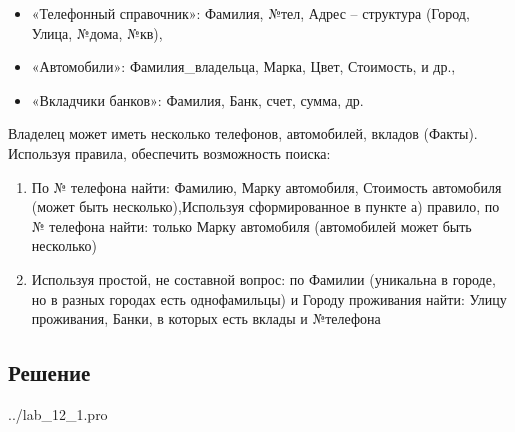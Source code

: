 \begin{itemize}
	\item «Телефонный справочник»: Фамилия, №тел, Адрес – структура (Город,
	Улица, №дома, №кв),
	\item «Автомобили»: Фамилия\_владельца, Марка, Цвет, Стоимость, и др.,
	\item «Вкладчики банков»: Фамилия, Банк, счет, сумма, др.
\end{itemize}
Владелец может иметь несколько телефонов, автомобилей, вкладов (Факты).
Используя правила, обеспечить возможность поиска:
\begin{enumerate}
	\item По № телефона найти: Фамилию, Марку автомобиля, Стоимость автомобиля
	(может быть несколько),Используя сформированное в пункте а) правило, по № телефона найти:
	только Марку автомобиля (автомобилей может быть несколько)
	\item Используя простой, не составной вопрос: по Фамилии (уникальна в городе, но в
	разных городах есть однофамильцы) и Городу проживания найти:
	Улицу
	проживания, Банки, в которых есть вклады и №телефона
\end{enumerate}

\subsection*{Решение}

\begin{lstinputlisting}[label=third,caption=Решение задания №3, language=lisp, firstline=0, lastline=41]{../lab_12_1.pro}
\end{lstinputlisting}

